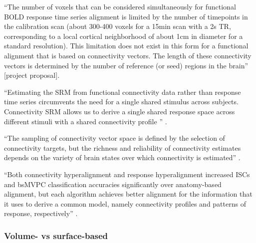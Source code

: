 ``The number of voxels that can be considered simultaneously for functional BOLD
response time series alignment is limited by the number of timepoints in the
calibration scan (about 300-400 voxels for a 15min scan with a 2s TR,
corresponding to a local cortical neighborhood of about 1cm in diameter for a
standard resolution).
%
This limitation does not exist in this form for a functional alignment that is
based on connectivity vectors.
%
The length of these connectivity vectors is determined by the number of
reference (or seed) regions in the brain'' [project proposal].

``Estimating the SRM from functional connectivity data rather than response time
series circumvents the need for a single shared stimulus across subjects.
%
Connectivity SRM allows us to derive a single shared response space across
different stimuli with a shared connectivity profile
\citep{nastase2019leveraging}'' \citep{kumar2020brainiak}.

%
``The sampling of connectivity vector space is defined by the selection of
connectivity targets, but the richness and reliability of connectivity estimates
depends on the variety of brain states over which connectivity is estimated''
\citep{haxby2020hyperalignment}.

%
``Both connectivity hyperalignment and response hyperalignment increased ISCs
and bsMVPC classification accuracies significantly over anatomy-based alignment,
but each algorithm achieves better alignment for the information that it uses to
derive a common model, namely connectivity profiles and patterns of response,
respectively'' \citep{guntupalli2018computational}.


\subsubsection{Volume- vs surface-based}





